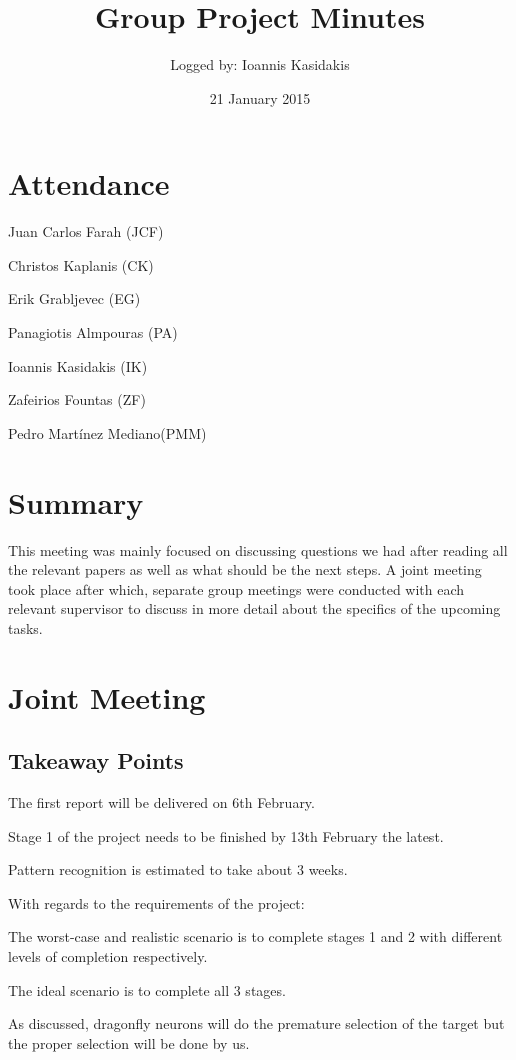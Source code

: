\documentclass{article}
\title{Group Project Minutes}
\author{Logged by: Ioannis Kasidakis}
\date{21 January 2015}
\begin{document}
\maketitle

\section*{Attendance}
\begin{compactenum}
\item Juan Carlos Farah (JCF)
\item Christos Kaplanis (CK)
\item Erik Grabljevec (EG)
\item Panagiotis Almpouras (PA)
\item Ioannis Kasidakis (IK)
\item Zafeirios Fountas (ZF)
\item Pedro Martínez Mediano(PMM)
\end{compactenum}

\section*{Summary}
This meeting was mainly focused on discussing questions we had after reading all the relevant papers as well as what should be the next steps. A joint meeting took place after which, separate group meetings were conducted with each relevant supervisor to discuss in more detail about the specifics of the upcoming tasks.

\section*{Joint Meeting}

{\addtolength{\leftskip}{3mm}
\subsection*{Takeaway Points}
}
\begin{compactenum}
\item The first report will be delivered on 6th February.
\item Stage 1 of the project needs to be finished by 13th February the latest.
\item Pattern recognition is estimated to take about 3 weeks.
\item With regards to the requirements of the project:
	\begin{compactenum}
	\item The worst-case and realistic scenario is to complete stages 1 and 2 with different levels of completion respectively.
	\item The ideal scenario is to complete all 3 stages.
	\end{compactenum}
\item As discussed, dragonfly neurons will do the premature selection of the target but the proper selection will be done by us.
\end{compactenum}
\end{document}
